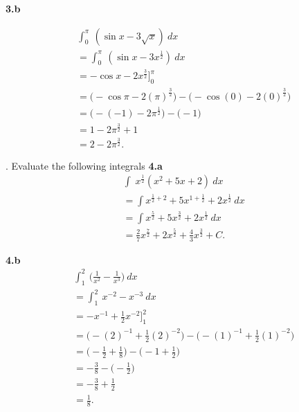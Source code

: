 \documentclass{report}
\begin{document}
    \bigbreak \noindent 
    \textbf{3.b}
    \bigbreak \noindent 
    \begin{minipage}{0.7\textwidth}
    \begin{align*}
        &\int_{0}^{\pi}\ (\sin{x}-3\sqrt{x})\ dx  \\
        &=\int_{0}^{\pi}\ (\sin{x}-3x^{\frac{1}{2}})\ dx \\
        &=-\cos{x}-2x^{\frac{3}{2}}\bigg]^{\pi}_0 \\
        &= \bigg(-\cos{\pi}-2(\pi)^{\frac{3}{2}}\bigg) - \bigg(-\cos{(0)}-2(0)^{\frac{3}{2}}\bigg) \\
        &= \bigg(-(-1)-2\pi^{\frac{1}{2}}\bigg) - \bigg(-1\bigg) \\
        &= 1-2\pi^{\frac{3}{2}} + 1 \\
        &= 2 - 2\pi^{\frac{3}{2}}
    .\end{align*}
    \end{minipage}

    \pagebreak \bigbreak {}. Evaluate the following integrals
    \bigbreak \noindent 
    \textbf{4.a}
    \begin{align*}
        &\int_{}^{}\ x^{\frac{1}{2}}(x^{2}+5x+2)\ dx \\
        &=\int x^{\frac{1}{2}+2}+5x^{1+\frac{1}{2}}+2x^{\frac{1}{2}}\ dx \\
        &=\int x^{\frac{5}{2}}+5x^{\frac{3}{2}}+2x^{\frac{1}{2}}\ dx \\
        &= \frac{2}{7}x^{\frac{7}{2}} + 2x^{\frac{5}{2}}+\frac{4}{3}x^{\frac{3}{2}} + C
    .\end{align*}

    \bigbreak \noindent 
    \textbf{4.b}
    \begin{align*}
        &\int_{1}^{2}\ \bigg(\frac{1}{x^{2}} -\frac{1}{x^{3}}\bigg)\ dx \\
        &=\int_{1}^{2}\ x^{-2}-x^{-3}\ dx \\
        &=-x^{-1}+\frac{1}{2}x^{-2}\bigg]^{2}_1 \\
        &=\bigg(-(2)^{-1}+\frac{1}{2}(2)^{-2}\bigg) - \bigg(-(1)^{-1}+\frac{1}{2}(1)^{-2}\bigg) \\
        &= \bigg(-\frac{1}{2}+\frac{1}{8}\bigg) - \bigg(-1 + \frac{1}{2}\bigg) \\
        &=-\frac{3}{8} - \bigg(-\frac{1}{2}\bigg) \\
        &= -\frac{3}{8} + \frac{1}{2} \\
        &=\frac{1}{8}
    .\end{align*}
\end{document}
